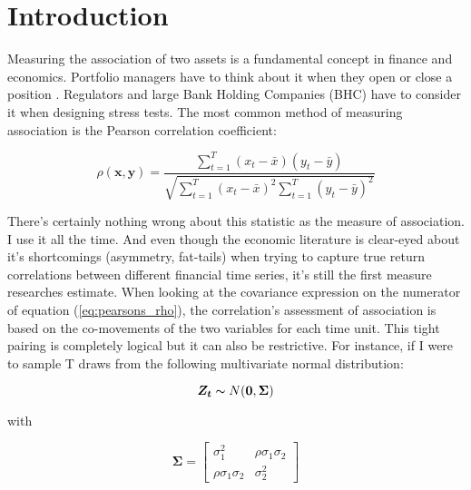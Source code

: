 \documentclass[12pt]{article}
\begin{document}
\section{Introduction}

Measuring the association of two assets is a fundamental concept in finance and economics. Portfolio managers have to think about it when they open or close a position \cite{Markowitz1952PortfolioSelection,sharpe1963simplified}. Regulators and large Bank Holding Companies (BHC) have to consider it when designing stress tests. The most common method of measuring association is the Pearson correlation coefficient:

\begin{equation} \label{eq:pearsons_rho}
\rho(\boldsymbol{x}, \boldsymbol{y}) = \frac{ \sum_{t=1}^{T} (x_{t} - \bar{x}) (y_{t} - \bar{y})}{ \sqrt{\sum_{t=1}^{T} (x_{t} - \bar{x})^{2} \sum_{t=1}^{T} (y_{t} - \bar{y})^{2}}}
\end{equation}

There's certainly nothing wrong about this statistic as the measure of association. I use it all the time. And even though the economic literature is clear-eyed about it's shortcomings (asymmetry, fat-tails) when trying to capture true return correlations between different financial time series, it's still the first measure researches estimate. When looking at the covariance expression on the numerator of equation (\ref{eq:pearsons_rho}), the correlation's assessment of association is based on the co-movements of the two variables for each time unit. This tight pairing is completely logical but it can also be restrictive. For instance, if I were to sample T draws from the following multivariate normal distribution:

\begin{equation}
    \boldsymbol{Z_{t}} \thicksim N(\boldsymbol{0}, \boldsymbol{\Sigma})
\end{equation}

with 

\begin{equation}
    \boldsymbol{\Sigma} = \begin{bmatrix}
        \sigma_{1}^{2}             & \rho \sigma_{1}\sigma_{2} \\
        \rho \sigma_{1} \sigma_{2} & \sigma_{2}^{2} 
    \end{bmatrix}
\end{equation}
\end{document}

